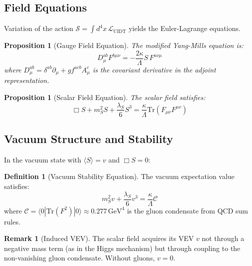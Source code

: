 \documentclass[11pt,a4paper]{article}
\providecommand{\Lagr}{\mathcal{L}}
\renewcommand{\Tr}{\mathrm{Tr}}
\theoremstyle{plain}
\newtheorem{proposition}[theorem]{Proposition}
\theoremstyle{definition}
\newtheorem{definition}[theorem]{Definition}
\newtheorem{remark}[theorem]{Remark}
\begin{document}
\subsection{Field Equations}

Variation of the action $\mathcal{S} = \int d^4x\,\Lagr_{\mathrm{UIDT}}$ yields the Euler-Lagrange equations.

\begin{proposition}[Gauge Field Equation]
\label{prop:gauge_eqn}
The modified Yang-Mills equation is:
\begin{equation}
D_\mu^{ab} F^{b\mu\nu} = -\frac{2\kappa}{\Lambda} S\, F^{a\nu\mu}
\label{eq:modified_ym}
\end{equation}
where $D_\mu^{ab} = \delta^{ab}\partial_\mu + g f^{acb} A^c_\mu$ is the covariant derivative in the adjoint representation.
\end{proposition}

\begin{proposition}[Scalar Field Equation]
\label{prop:scalar_eqn}
The scalar field satisfies:
\begin{equation}
\Box S + m_S^2 S + \frac{\lambda_S}{6}S^3 = \frac{\kappa}{\Lambda}\Tr(F_{\mu\nu}F^{\mu\nu})
\label{eq:scalar_eqn}
\end{equation}
\end{proposition}

\subsection{Vacuum Structure and Stability}

In the vacuum state with $\langle S \rangle = v$ and $\Box S = 0$:

\begin{definition}[Vacuum Stability Equation]
\label{def:vse}
The vacuum expectation value satisfies:
\begin{equation}
m_S^2 v + \frac{\lambda_S}{6}v^3 = \frac{\kappa}{\Lambda}\mathcal{C}
\label{eq:vse}
\end{equation}
where $\mathcal{C} = \langle 0|\Tr(F^2)|0\rangle \approx 0.277\,\mathrm{GeV}^4$ is the gluon condensate from QCD sum rules.
\end{definition}

\begin{remark}[Induced VEV]
The scalar field acquires its VEV $v$ not through a negative mass term (as in the Higgs mechanism) but through coupling to the non-vanishing gluon condensate. Without gluons, $v = 0$.
\end{remark}
\end{document}
